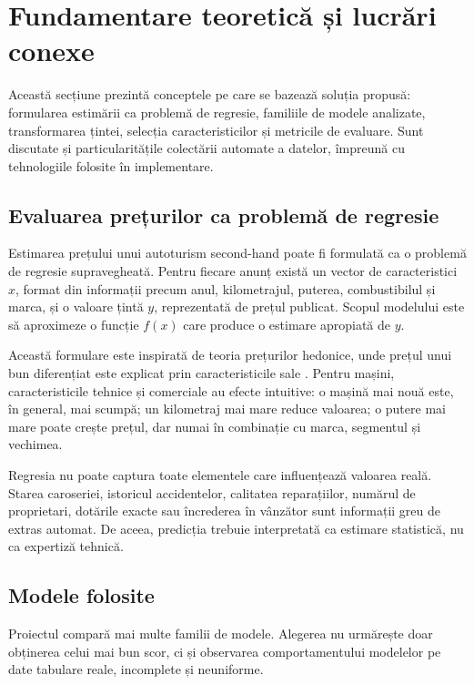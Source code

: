\section{Fundamentare teoretică și lucrări conexe}
\label{sec:market-background}

Această secțiune prezintă conceptele pe care se bazează soluția propusă: formularea estimării ca problemă de regresie, familiile de modele analizate, transformarea țintei, selecția caracteristicilor și metricile de evaluare. Sunt discutate și particularitățile colectării automate a datelor, împreună cu tehnologiile folosite în implementare.

\subsection{Evaluarea prețurilor ca problemă de regresie}
\label{sec:background-regression}

Estimarea prețului unui autoturism second-hand poate fi formulată ca o problemă de regresie supravegheată. Pentru fiecare anunț există un vector de caracteristici \(x\), format din informații precum anul, kilometrajul, puterea, combustibilul și marca, și o valoare țintă \(y\), reprezentată de prețul publicat. Scopul modelului este să aproximeze o funcție \(f(x)\) care produce o estimare apropiată de \(y\).

Această formulare este inspirată de teoria prețurilor hedonice, unde prețul unui bun diferențiat este explicat prin caracteristicile sale \cite{rosen1974hedonic}. Pentru mașini, caracteristicile tehnice și comerciale au efecte intuitive: o mașină mai nouă este, în general, mai scumpă; un kilometraj mai mare reduce valoarea; o putere mai mare poate crește prețul, dar numai în combinație cu marca, segmentul și vechimea.

Regresia nu poate captura toate elementele care influențează valoarea reală. Starea caroseriei, istoricul accidentelor, calitatea reparațiilor, numărul de proprietari, dotările exacte sau încrederea în vânzător sunt informații greu de extras automat. De aceea, predicția trebuie interpretată ca estimare statistică, nu ca expertiză tehnică.

\subsection{Modele folosite}
\label{sec:background-models}

Proiectul compară mai multe familii de modele. Alegerea nu urmărește doar obținerea celui mai bun scor, ci și observarea comportamentului modelelor pe date tabulare reale, incomplete și neuniforme.

